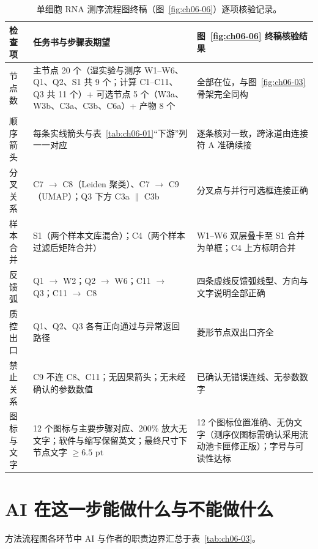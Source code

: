 \begin{table}[htbp]\centering\footnotesize
\setlength{\tabcolsep}{4pt}
\renewcommand{\arraystretch}{1.15}
\caption{单细胞 RNA 测序流程图终稿（图~\ref{fig:ch06-06}）逐项核验记录。}\label{tab:ch06-04}
\begin{tabularx}{\linewidth}{@{}>{\raggedright\arraybackslash}p{22mm}YY@{}}
\toprule
\textbf{检查项} & \textbf{任务书与步骤表期望} & \textbf{图~\ref{fig:ch06-06} 终稿核验结果} \\
\midrule
节点数 & 主节点 20 个（湿实验与测序 W1–W6、Q1、Q2、S1 共 9 个；计算 C1–C11、Q3 共 11 个）+ 可选节点 5 个（W3a、W3b、C3a、C3b、C6a）+ 产物 8 个 & 全部在位，与图~\ref{fig:ch06-03} 骨架完全同构 \\
顺序箭头 & 每条实线箭头与表~\ref{tab:ch06-01}“下游”列一一对应 & 逐条核对一致，跨泳道由连接符 A 准确续接 \\
分叉关系 & C7 $\rightarrow$ C8（Leiden 聚类）、C7 $\rightarrow$ C9（UMAP）；Q3 下方 C3a $\parallel$ C3b & 分叉点与并行可选框连接正确 \\
样本合并 & S1（两个样本文库混合）；C4（两个样本过滤后矩阵合并） & W1–W6 双层叠卡至 S1 合并为单框；C4 上方标明合并 \\
反馈弧 & Q1 $\rightarrow$ W2；Q2 $\rightarrow$ W6；C11 $\rightarrow$ Q3；C11 $\rightarrow$ C8 & 四条虚线反馈弧线型、方向与文字说明全部正确 \\
质控出口 & Q1、Q2、Q3 各有正向通过与异常返回路径 & 菱形节点双出口齐全 \\
禁止关系 & C9 不连 C8、C11；无因果箭头；无未经确认的参数数值 & 已确认无错误连线、无参数数字 \\
图标与文字 & 12 个图标与主要步骤对应、200\% 放大无文字；软件与缩写保留英文；最终尺寸下节点文字 $\ge 6.5\text{ pt}$ & 12 个图标位置准确、无伪文字（测序仪图标需确认采用流动池卡匣修正版）；字号与可读性达标 \\
\bottomrule
\end{tabularx}
\end{table}

\section{AI 在这一步能做什么与不能做什么}

方法流程图各环节中 AI 与作者的职责边界汇总于表~\ref{tab:ch06-03}。

